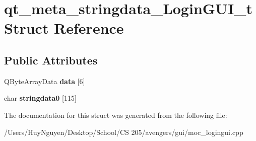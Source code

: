 \hypertarget{structqt__meta__stringdata__LoginGUI__t}{}\section{qt\+\_\+meta\+\_\+stringdata\+\_\+\+Login\+G\+U\+I\+\_\+t Struct Reference}
\label{structqt__meta__stringdata__LoginGUI__t}
\subsection*{Public Attributes}
\begin{DoxyCompactItemize}
\item 
Q\+Byte\+Array\+Data {\bfseries data} \mbox{[}6\mbox{]}\hypertarget{structqt__meta__stringdata__LoginGUI__t_a3c2ce24290db4f479cf9931b556dcaca}{}\label{structqt__meta__stringdata__LoginGUI__t_a3c2ce24290db4f479cf9931b556dcaca}

\item 
char {\bfseries stringdata0} \mbox{[}115\mbox{]}\hypertarget{structqt__meta__stringdata__LoginGUI__t_a4878b89b7f6dfb361322414a82cac59b}{}\label{structqt__meta__stringdata__LoginGUI__t_a4878b89b7f6dfb361322414a82cac59b}

\end{DoxyCompactItemize}


The documentation for this struct was generated from the following file\+:\begin{DoxyCompactItemize}
\item 
/\+Users/\+Huy\+Nguyen/\+Desktop/\+School/\+C\+S 205/avengers/gui/moc\+\_\+logingui.\+cpp\end{DoxyCompactItemize}
